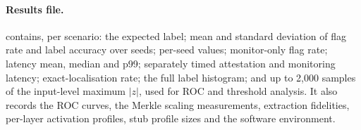 \paragraph{Results file.}  contains, per scenario: the expected label; mean
and standard deviation of flag rate and label accuracy over seeds; per-seed values; monitor-only
flag rate; latency mean, median and p99; separately timed attestation and monitoring latency;
exact-localisation rate; the full label histogram; and up to 2{,}000 samples of the input-level
maximum $|z|$, used for ROC and threshold analysis. It also records the ROC curves, the Merkle
scaling measurements, extraction fidelities, per-layer activation profiles, stub profile sizes
and the software environment.
